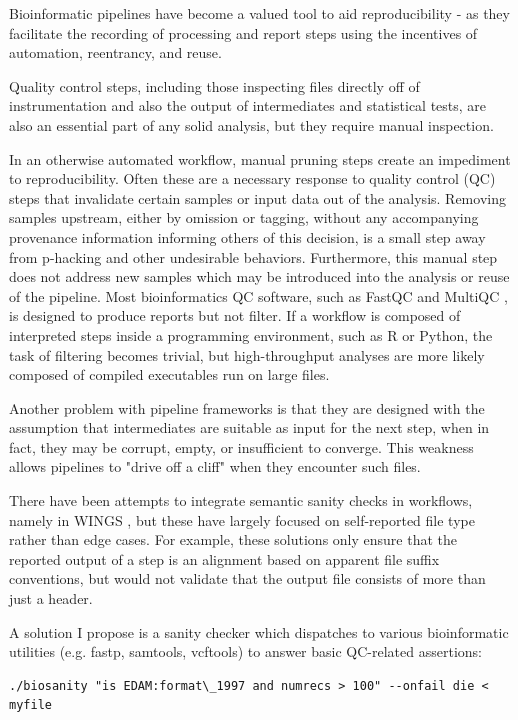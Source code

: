 \documentclass{drexelthesis}
\begin{document}
Bioinformatic pipelines have become a valued tool to aid reproducibility - as they facilitate the recording of processing and report steps using the incentives of automation, reentrancy, and reuse.

Quality control steps, including those inspecting files directly off of instrumentation and also the output of intermediates and statistical tests, are also an essential part of any solid analysis, but they require manual inspection. 

In an otherwise automated workflow, manual pruning steps create an impediment to reproducibility. Often these are a necessary response to quality control (QC) steps that invalidate certain samples or input data out of the analysis. Removing samples upstream, either by omission or tagging, without any accompanying provenance information informing others of this decision, is a small step away from p-hacking and other undesirable behaviors. Furthermore, this manual step does not address new samples which may be introduced into the analysis or reuse of the pipeline. Most bioinformatics QC software, such as FastQC \cite{Andrews2010-bz} and MultiQC \cite{Ewels2016-uv}, is designed to produce reports but not filter. If a workflow is composed of interpreted steps inside a programming environment, such as R or Python, the task of filtering becomes trivial, but high-throughput analyses are more likely composed of compiled executables run on large files.

Another problem with pipeline frameworks is that they are designed with the assumption that intermediates are suitable as input for the next step, when in fact, they may be corrupt, empty, or insufficient to converge. This weakness allows pipelines to "drive off a cliff" when they encounter such files.

There have been attempts to integrate semantic sanity checks in workflows, namely in WINGS \cite{Zheng2015-qc}, but these have largely focused on self-reported file type rather than edge cases. For example, these solutions only ensure that the reported output of a step is an alignment based on apparent file suffix conventions, but would not validate that the output file consists of more than just a header.

A solution I propose is a sanity checker which dispatches to various bioinformatic utilities (e.g. fastp, samtools, vcftools) to answer basic QC-related assertions:

\begin{verbatim}
./biosanity "is EDAM:format\_1997 and numrecs > 100" --onfail die < myfile
\end{verbatim}
\end{document}
